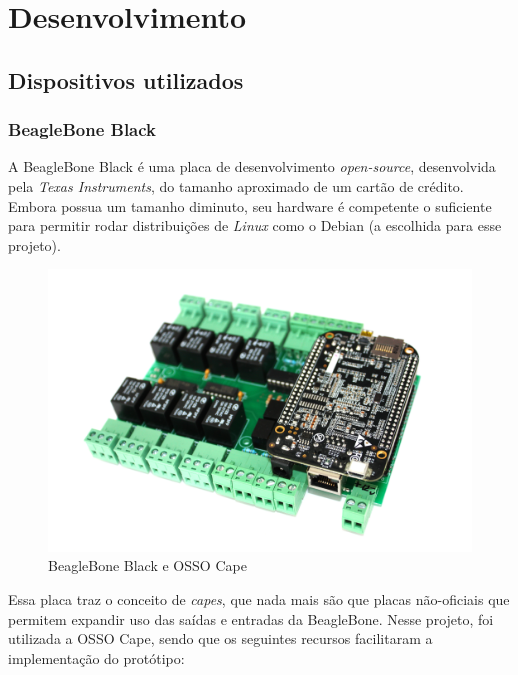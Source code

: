 \chapter{Desenvolvimento}

\section{Dispositivos utilizados}

\subsection{BeagleBone Black}

A BeagleBone Black é uma placa de desenvolvimento \textit{open-source}, desenvolvida pela \textit{Texas Instruments}, do tamanho aproximado de um cartão de crédito. Embora possua um tamanho diminuto, seu hardware é competente o suficiente para permitir rodar distribuições de \textit{Linux} como o Debian (a escolhida para esse projeto).

\begin{figure}[H]
        \begin{center}
                \includegraphics[width=\textwidth,natwidth=585,natheight=180]{assets/images/beaglebone.jpg}
                \caption{BeagleBone Black e OSSO Cape}
                \label{fig:bbb}
        \end{center}
\end{figure}

Essa placa traz o conceito de \textit{capes}, que nada mais são que placas não-oficiais que permitem expandir uso das saídas e entradas da BeagleBone. Nesse projeto, foi utilizada a OSSO Cape, sendo que os seguintes recursos facilitaram a implementação do protótipo:


